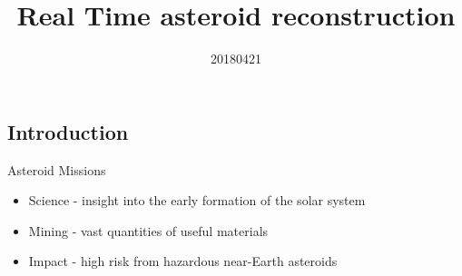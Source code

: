 \documentclass[11pt,professionalfonts]{beamer}
\title[Asteroid Reconstruction]{\large\textbf Real Time asteroid reconstruction}
\author{\vspace*{-0.3cm}}
\institute{
	\footnotesize
	{\normalsize\bf{Shankar Kulumani\\ Advisor: Taeyoung Lee}}\\
	\vspace*{0.2cm}
  	\textbf{Department of Mechanical \& Aerospace Engineering}\\ \vspace*{0.5cm}
 	\begin{figure} %
       	\texttt{[image: gw\_txh\_2cs\_pos]}
  	\end{figure}
}
\date{20180421}
\begin{document}

\setcounter{framenumber}{-1}
\begin{frame} %
  \titlepage
\end{frame}   %

\section*{}
\subsection*{Introduction}  
\begin{frame}{Asteroid Missions}
\begin{itemize}
    \item<1-> Science - insight into the early formation of the solar system
    \item<2-> Mining - vast quantities of useful materials
    \item<3-> Impact - high risk from hazardous near-Earth asteroids
\end{itemize}    

\end{frame}
\end{document}
